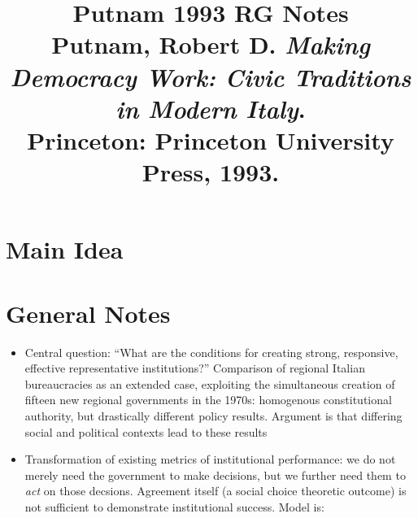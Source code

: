 \documentclass[12pt]{article}
\title{\textbf{Putnam 1993 RG Notes}\\
\large Putnam, Robert D. \textit{Making Democracy Work: Civic Traditions in Modern Italy}.\\
Princeton: Princeton University Press, 1993.}
\author{}
\date{}
\begin{document}
\maketitle

\section{Main Idea}



\section{General Notes}

\begin{itemize}[leftmargin=*, itemsep=4pt]
    \item Central question: ``What are the conditions for creating strong, responsive, effective representative institutions?'' Comparison of regional Italian bureaucracies as an extended case, exploiting the simultaneous creation of fifteen new regional governments in the 1970s: homogenous constitutional authority, but drastically different policy results. Argument is that differing social and political contexts lead to these results
    \item Transformation of existing metrics of institutional performance: we do not merely need the government to make decisions, but we further need them to \emph{act} on those decsions. Agreement itself (a social choice theoretic outcome) is not sufficient to demonstrate institutional success. Model is:
    

\end{itemize}
\end{document}
